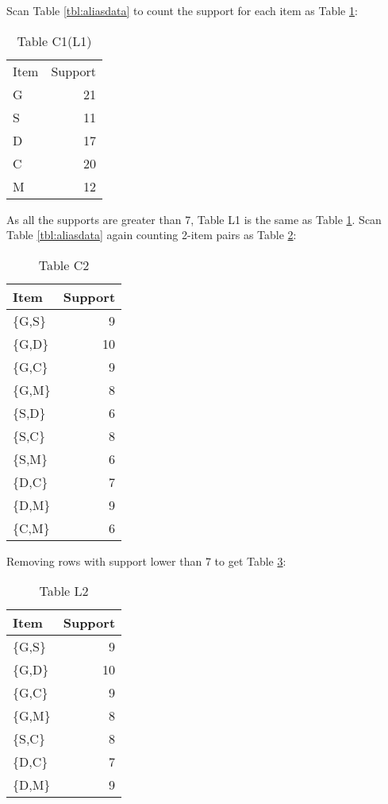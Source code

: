 \documentclass[10pt]{article}
\begin{document}
Scan Table \ref{tbl:aliasdata} to count the support for each item as Table \ref{tbl:C1}:
\begin{table}[htb]
\caption{\label{tbl:C1}Table C1(L1)}
\begin{center}
\begin{tabular}{lr}
 Item  &  Support  \\
 G     &       21  \\
 S     &       11  \\
 D     &       17  \\
 C     &       20  \\
 M     &       12  \\
\end{tabular}
\end{center}
\end{table}

As all the supports are greater than 7, Table L1 is the same as Table \ref{tbl:C1}.
Scan Table \ref{tbl:aliasdata} again counting 2-item pairs as Table \ref{tbl:C2}:
\begin{table}[htb]
\caption{\label{tbl:C2}Table C2}
\begin{center}
\begin{tabular}{lr}
 Item     &  Support  \\
\hline
 \{G,S\}  &        9  \\
 \{G,D\}  &       10  \\
 \{G,C\}  &        9  \\
 \{G,M\}  &        8  \\
 \{S,D\}  &        6  \\
 \{S,C\}  &        8  \\
 \{S,M\}  &        6  \\
 \{D,C\}  &        7  \\
 \{D,M\}  &        9  \\
 \{C,M\}  &        6  \\
\end{tabular}
\end{center}
\end{table}

Removing rows with support lower than 7 to get Table \ref{tbl:L2}:
\begin{table}[htb]
\caption{\label{tbl:L2}Table L2}
\begin{center}
\begin{tabular}{lr}
 Item     &  Support  \\
\hline
 \{G,S\}  &        9  \\
 \{G,D\}  &       10  \\
 \{G,C\}  &        9  \\
 \{G,M\}  &        8  \\
 \{S,C\}  &        8  \\
 \{D,C\}  &        7  \\
 \{D,M\}  &        9  \\
\end{tabular}
\end{center}
\end{table}
\end{document}
